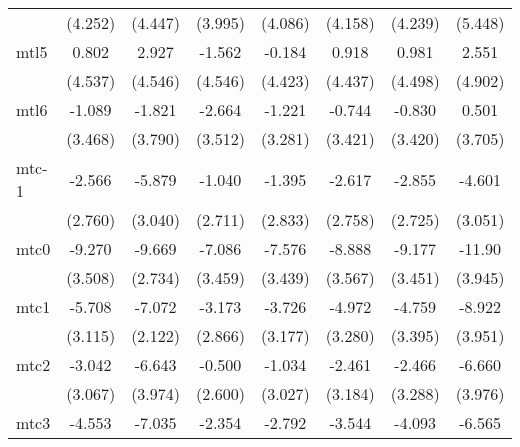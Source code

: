 \documentclass{article}
\begin{document}
{\begin{longtable}{l*{7}{c}}
                &  (4.252)         &  (4.447)         &  (3.995)         &  (4.086)         &  (4.158)         &  (4.239)         &  (5.448)         \\
mtl5            &    0.802         &    2.927         &   -1.562         &   -0.184         &    0.918         &    0.981         &    2.551         \\
                &  (4.537)         &  (4.546)         &  (4.546)         &  (4.423)         &  (4.437)         &  (4.498)         &  (4.902)         \\
mtl6            &   -1.089         &   -1.821         &   -2.664         &   -1.221         &   -0.744         &   -0.830         &    0.501         \\
                &  (3.468)         &  (3.790)         &  (3.512)         &  (3.281)         &  (3.421)         &  (3.420)         &  (3.705)         \\
mtc-1           &   -2.566         &   -5.879         &   -1.040         &   -1.395         &   -2.617         &   -2.855         &   -4.601         \\
                &  (2.760)         &  (3.040)         &  (2.711)         &  (2.833)         &  (2.758)         &  (2.725)         &  (3.051)         \\
mtc0            &   -9.270\sym{*}  &   -9.669\sym{**} &   -7.086\sym{*}  &   -7.576\sym{*}  &   -8.888\sym{*}  &   -9.177\sym{*}  &   -11.90\sym{**} \\
                &  (3.508)         &  (2.734)         &  (3.459)         &  (3.439)         &  (3.567)         &  (3.451)         &  (3.945)         \\
mtc1            &   -5.708         &   -7.072\sym{**} &   -3.173         &   -3.726         &   -4.972         &   -4.759         &   -8.922\sym{*}  \\
                &  (3.115)         &  (2.122)         &  (2.866)         &  (3.177)         &  (3.280)         &  (3.395)         &  (3.951)         \\
mtc2            &   -3.042         &   -6.643         &   -0.500         &   -1.034         &   -2.461         &   -2.466         &   -6.660         \\
                &  (3.067)         &  (3.974)         &  (2.600)         &  (3.027)         &  (3.184)         &  (3.288)         &  (3.976)         \\
mtc3            &   -4.553         &   -7.035\sym{*}  &   -2.354         &   -2.792         &   -3.544         &   -4.093         &   -6.565\sym{*}  \\

\end{longtable}}
\end{document}
